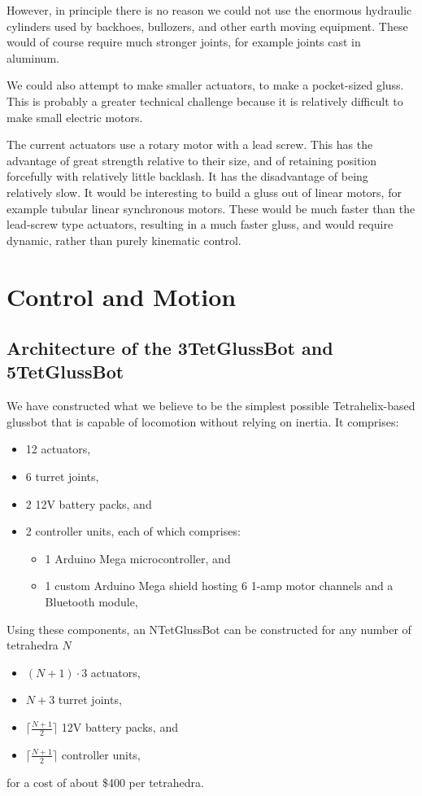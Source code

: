 \documentclass[11pt]{article}
\begin{document}
However, in principle there is no reason we could not use the enormous hydraulic cylinders
used by backhoes, bullozers, and other earth moving equipment. These would of course require much
stronger joints, for example joints cast in aluminum.

We could also attempt to make smaller actuators, to make a pocket-sized gluss. This is probably
a greater technical challenge because it is relatively difficult to make small electric motors.

The current actuators use a rotary motor with a lead screw. This has the advantage of great
strength relative to their size, and of retaining position forcefully with relatively little backlash. It has the disadvantage
of being relatively slow. It would be interesting to build a gluss out of linear motors, for
example tubular linear synchronous motors. These would be much faster than the lead-screw type
actuators, resulting in a much faster gluss, and would require dynamic, rather than purely kinematic control. 

\section{Control and Motion}
\subsection{Architecture of the 3TetGlussBot and 5TetGlussBot}

We have constructed what we believe to be the simplest possible Tetrahelix-based glussbot that is capable of locomotion
without relying on inertia.
It comprises:
\begin{itemize}  
\item 12 actuators,
\item 6 turret joints,
\item 2 12V battery packs, and
\item 2 controller units, each of which comprises:
\begin{itemize}  
\item 1 Arduino Mega microcontroller, and
\item 1 custom Arduino Mega shield hosting 6 1-amp motor channels and a Bluetooth module,
\end{itemize}  
\end{itemize}

Using these components, an NTetGlussBot can be constructed for any number of tetrahedra $N$

\begin{itemize}  
\item $(N + 1)\cdot 3$  actuators,
\item $N+3$ turret joints,
\item $\lceil \frac{N + 1}{2} \rceil$ 12V battery packs, and
\item $\lceil \frac{N + 1}{2} \rceil$ controller units,
\end{itemize}
for a cost of about \$400 per tetrahedra.
\end{document}
